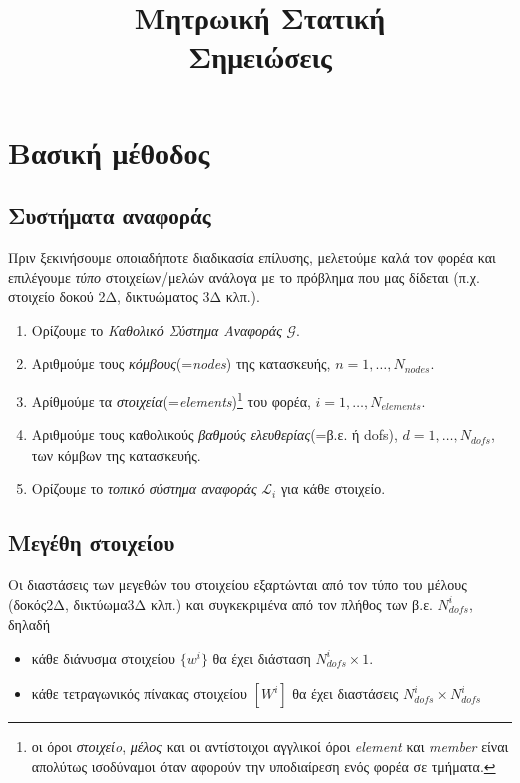 \documentclass[a4paper, twocolumn]{article}
\title{Μητρωική Στατική\\
\Large Σημειώσεις}
\date{}
\newcommand{\num}[1]{ N_{\mathit{#1}} }
\newcommand{\gs}{\mathcal{G}}
\newcommand{\ls}{\mathcal{L}_i}
\newcommand{\vect}[1]{ \{ #1\} }
\newcommand{\mat}[1]{\left[ #1 \right]}
\begin{document}
\maketitle

\section{Βασική μέθοδος}

\subsection{Συστήματα αναφοράς}
Πριν ξεκινήσουμε οποιαδήποτε διαδικασία επίλυσης, μελετούμε καλά τον 
φορέα και επιλέγουμε \emph{τύπο} στοιχείων/μελών ανάλογα με το 
πρόβλημα που μας δίδεται (π.χ. στοιχείο δοκού 2Δ, δικτυώματος 3Δ 
κλπ.).
\begin{enumerate}
	\item Oρίζουμε το \emph{Καθολικό Σύστημα Αναφοράς} $\gs$.
	\item Αριθμούμε τους \emph{κόμβους}(=\emph{nodes}) της 
	κατασκευής, $n=1, 
	\dots,\num{nodes}$.
	\item Αρίθμούμε τα \emph{στοιχεία}(=\emph{elements})\footnote{
	οι όροι \emph{στοιχείo}, \emph{μέλος} και οι αντίστοιχοι αγγλικοί 
	όροι \emph{element} και \emph{member} είναι απολύτως ισοδύναμοι 
	όταν αφορούν την υποδιαίρεση ενός φορέα σε τμήματα.} του φορέα, 
	$i=1, \dots, \num{elements}$.
	\item Αριθμούμε τους καθολικούς \emph{βαθμούς ελευθερίας}(=β.ε. ή 
	dofs), $d=1, \dots, \num{dofs}$,
	των κόμβων της κατασκευής.

	\item Ορίζουμε το \emph{τοπικό σύστημα αναφοράς} $\ls$ 
	για κάθε στοιχείο.
\end{enumerate}

\subsection{Μεγέθη στοιχείου}
Οι διαστάσεις των μεγεθών του στοιχείου 
εξαρτώνται από τον τύπο του 
μέλους (δοκός2Δ, δικτύωμα3Δ κλπ.) και συγκεκριμένα 
από τον πλήθος των 
β.ε. $\num{dofs}^i$, δηλαδή
\begin{itemize}
	\item κάθε διάνυσμα στοιχείου $\vect{w^i}$ θα έχει διάσταση 
	$\num{dofs}^i \times 1$.
	\item κάθε τετραγωνικός πίνακας στοιχείου $\mat{W^i}$ θα έχει 
	διαστάσεις $\num{dofs}^i  \times \num{dofs}^i$
\end{itemize}
\end{document}
